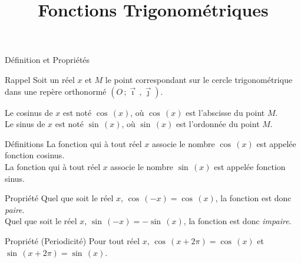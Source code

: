 \documentclass{cours}
\title{Fonctions Trigonométriques}
\begin{document}

    \begin{Gpartie}{Définition et Propriétés} 
        \begin{Spartie}{Rappel} 
            Soit un réel $x$ et $M$ le point correspondant sur le cercle trigonométrique dans une repère orthonormé $\left(O\,; \vec{\imath}\,, \vec{\jmath}\right)$.

            Le cosinus de $x$ est noté $\cos\,(x)$, où $\cos\,(x)$ est l'abscisse du point $M$. \\
            Le sinus de $x$ est noté $\sin\,(x)$, où $\sin\,(x)$ est l'ordonnée du point $M$.
            
            \begin{center}
                \parbox{\linewidth}{}
            \end{center}
        \end{Spartie}
        \begin{Spartie}{Définitions} 
            La fonction qui à tout réel $x$ associe le nombre $\cos\,(x)$ est appelée fonction cosinus. \\
            La fonction qui à tout réel $x$ associe le nombre $\sin\,(x)$ est appelée fonction sinus.
        \end{Spartie}
        \begin{Spartie}{Propriété} 
            Quel que soit le réel $x$, $\cos\,(-x)=\cos\,(x)$, la fonction est donc \emph{paire}. \\
            Quel que soit le réel $x$, $\sin\,(-x)=-\sin\,(x)$, la fonction est donc \emph{impaire}.
        \end{Spartie}
        \pagebreak
        \begin{Spartie}{Propriété (Periodicité)} 
            Pour tout réel $x$, $\cos\,(x+2\pi)=\cos\,(x)$ et $\sin\,(x+2\pi)=\sin\,(x)$.


\end{Spartie}
\end{Gpartie}
\end{document}
